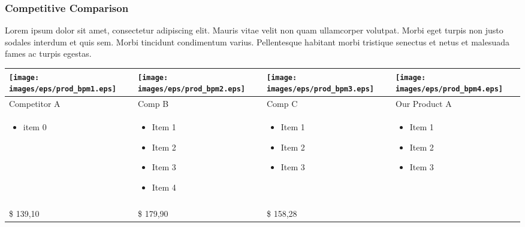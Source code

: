 \documentclass[11pt]{article}
\begin{document}
\subsubsection{Competitive Comparison}
Lorem ipsum dolor sit amet, consectetur adipiscing elit. Mauris vitae velit 
non quam ullamcorper volutpat. Morbi eget turpis non justo sodales interdum 
et quis sem. Morbi tincidunt condimentum varius. Pellentesque habitant morbi 
tristique senectus et netus et malesuada fames ac turpis egestas.\newline
\begin{tabular}{| m{92 pt} | m{92 pt} | m{92 pt} | m{92 pt} |}\hline
	\texttt{[image: images/eps/prod\_bpm1.eps]} & 
		\texttt{[image: images/eps/prod\_bpm2.eps]} & 
		\texttt{[image: images/eps/prod\_bpm3.eps]} & 
		\texttt{[image: images/eps/prod\_bpm4.eps]} \\ \hline
	Competitor A & Comp B & Comp C & Our Product A\\ \hline
	\begin{itemize} \tiny \item  item 0 \end{itemize} & 
					\begin{itemize} \tiny 
							\item Item 1
							\item Item 2
							\item Item 3
							\item Item 4\end{itemize} & 
					\begin{itemize} \tiny 
							\item Item 1
							\item Item 2
							\item Item 3\end{itemize}& 
					\begin{itemize} \tiny 
							\item Item 1
							\item Item 2
							\item Item 3 \end{itemize} \\
	& & & \\ \hline
	\$ 139,10 & \$ 179,90 & \$ 158,28 & \\ \hline
\end{tabular}
\end{document}
